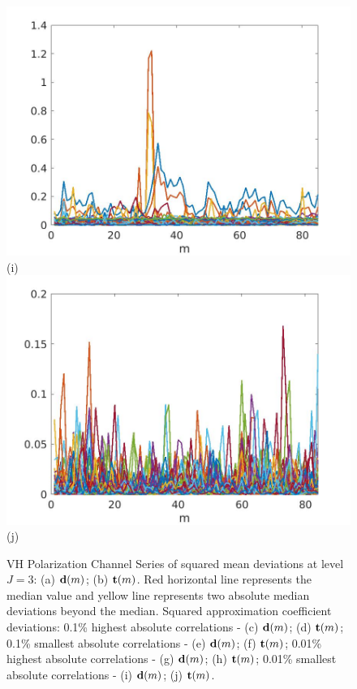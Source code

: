 \documentclass[journal]{IEEEtran}
\newcommand{\vd}{{\textbf d}}
\newcommand{\vt}{{\textbf t}}
\begin{document}
\begin{figure}[htp!]
\includegraphics[scale=.12]{../../figs/perc01_J3_VH_sqrdif_lowest_cor_locations}(i)
\includegraphics[scale=.12]{../../figs/perc01_consecdif_J3_VH_sqrdif_lowest_cor_locations}(j)

\caption{{\sc VH Polarization Channel} Series of squared mean deviations at level $J=3$: (a) $\vd(m)$; (b) $\vt(m)$. Red horizontal line represents the median value and yellow line represents two absolute median deviations beyond the median. Squared approximation coefficient deviations: 0.1\% highest absolute correlations - (c) $\vd(m)$;  (d) $\vt(m)$; 0.1\% smallest absolute correlations - (e) $\vd(m)$; (f) $\vt(m)$; 0.01\% highest absolute correlations - (g) $\vd(m)$;  (h) $\vt(m)$;  0.01\% smallest absolute correlations - (i) $\vd(m)$; (j)  $\vt(m)$. 
}  
\label{F:squared_meandev_J3_VH}
\end{figure}
\end{document}
